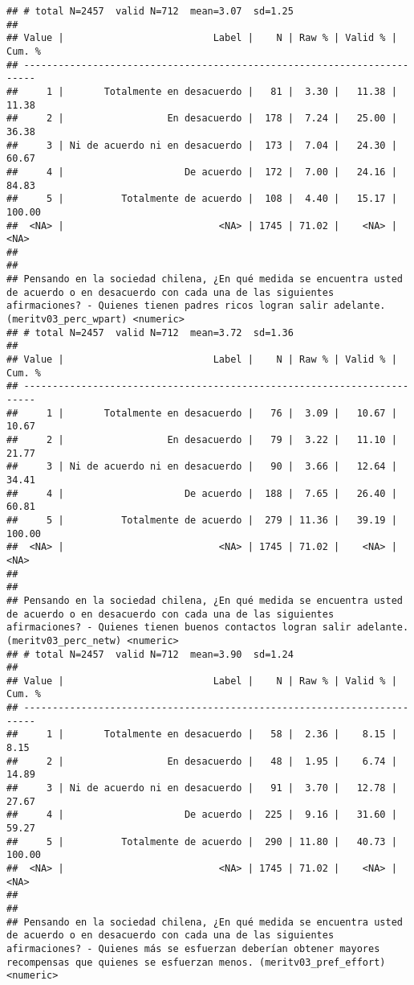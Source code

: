 \documentclass[
  10,
  landscape,
  legalpaper]{article}
\begin{document}
\begin{verbatim}
## # total N=2457  valid N=712  mean=3.07  sd=1.25
## 
## Value |                          Label |    N | Raw % | Valid % | Cum. %
## ------------------------------------------------------------------------
##     1 |       Totalmente en desacuerdo |   81 |  3.30 |   11.38 |  11.38
##     2 |                  En desacuerdo |  178 |  7.24 |   25.00 |  36.38
##     3 | Ni de acuerdo ni en desacuerdo |  173 |  7.04 |   24.30 |  60.67
##     4 |                     De acuerdo |  172 |  7.00 |   24.16 |  84.83
##     5 |          Totalmente de acuerdo |  108 |  4.40 |   15.17 | 100.00
##  <NA> |                           <NA> | 1745 | 71.02 |    <NA> |   <NA>
## 
## 
## Pensando en la sociedad chilena, ¿En qué medida se encuentra usted de acuerdo o en desacuerdo con cada una de las siguientes afirmaciones? - Quienes tienen padres ricos logran salir adelante. (meritv03_perc_wpart) <numeric>
## # total N=2457  valid N=712  mean=3.72  sd=1.36
## 
## Value |                          Label |    N | Raw % | Valid % | Cum. %
## ------------------------------------------------------------------------
##     1 |       Totalmente en desacuerdo |   76 |  3.09 |   10.67 |  10.67
##     2 |                  En desacuerdo |   79 |  3.22 |   11.10 |  21.77
##     3 | Ni de acuerdo ni en desacuerdo |   90 |  3.66 |   12.64 |  34.41
##     4 |                     De acuerdo |  188 |  7.65 |   26.40 |  60.81
##     5 |          Totalmente de acuerdo |  279 | 11.36 |   39.19 | 100.00
##  <NA> |                           <NA> | 1745 | 71.02 |    <NA> |   <NA>
## 
## 
## Pensando en la sociedad chilena, ¿En qué medida se encuentra usted de acuerdo o en desacuerdo con cada una de las siguientes afirmaciones? - Quienes tienen buenos contactos logran salir adelante. (meritv03_perc_netw) <numeric>
## # total N=2457  valid N=712  mean=3.90  sd=1.24
## 
## Value |                          Label |    N | Raw % | Valid % | Cum. %
## ------------------------------------------------------------------------
##     1 |       Totalmente en desacuerdo |   58 |  2.36 |    8.15 |   8.15
##     2 |                  En desacuerdo |   48 |  1.95 |    6.74 |  14.89
##     3 | Ni de acuerdo ni en desacuerdo |   91 |  3.70 |   12.78 |  27.67
##     4 |                     De acuerdo |  225 |  9.16 |   31.60 |  59.27
##     5 |          Totalmente de acuerdo |  290 | 11.80 |   40.73 | 100.00
##  <NA> |                           <NA> | 1745 | 71.02 |    <NA> |   <NA>
## 
## 
## Pensando en la sociedad chilena, ¿En qué medida se encuentra usted de acuerdo o en desacuerdo con cada una de las siguientes afirmaciones? - Quienes más se esfuerzan deberían obtener mayores recompensas que quienes se esfuerzan menos. (meritv03_pref_effort) <numeric>

\end{verbatim}
\end{document}
